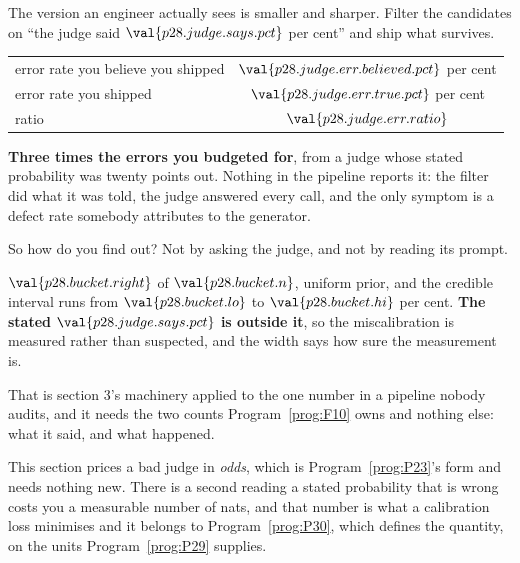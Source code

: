 \begin{fr}
The version an engineer actually sees is smaller and sharper. Filter the
candidates on \enquote{the judge said $\val{p28.judge.says.pct}$ per cent} and
ship what survives.

\begin{center}
\begin{tabular}{lc}
\toprule
error rate you believe you shipped & $\val{p28.judge.err.believed.pct}$ per cent \\
error rate you shipped & $\val{p28.judge.err.true.pct}$ per cent \\
\midrule
ratio & $\val{p28.judge.err.ratio}$ \\
\bottomrule
\end{tabular}
\end{center}

\textbf{Three times the errors you budgeted for}, from a judge whose stated
probability was twenty points out. Nothing in the pipeline reports it: the
filter did what it was told, the judge answered every call, and the only
symptom is a defect rate somebody attributes to the generator.

So how do you find out? Not by asking the judge, and not by reading its
prompt.
\dotline
\nextframe
\end{fr}

\begin{fr}

$\val{p28.bucket.right}$ of $\val{p28.bucket.n}$, uniform prior, and the
credible interval runs from $\val{p28.bucket.lo}$ to $\val{p28.bucket.hi}$ per
cent. \textbf{The stated $\val{p28.judge.says.pct}$ is outside it}, so the
miscalibration is measured rather than suspected,
and the width says how sure the measurement is.

That is section 3's machinery applied to the one number in a pipeline nobody
audits, and it needs the two counts Program~\ref{prog:F10} owns and nothing
else: what it said, and what happened.

\begin{note}
This section prices a bad judge in \emph{odds}, which is
Program~\ref{prog:P23}'s form and needs nothing new. There is a second reading
\dash{} a stated probability that is wrong costs you a measurable number of
nats, and that number is what a calibration loss minimises \dash{} and it
belongs to Program~\ref{prog:P30}, which defines the quantity, on the
units Program~\ref{prog:P29} supplies.
\end{note}
\end{fr}

